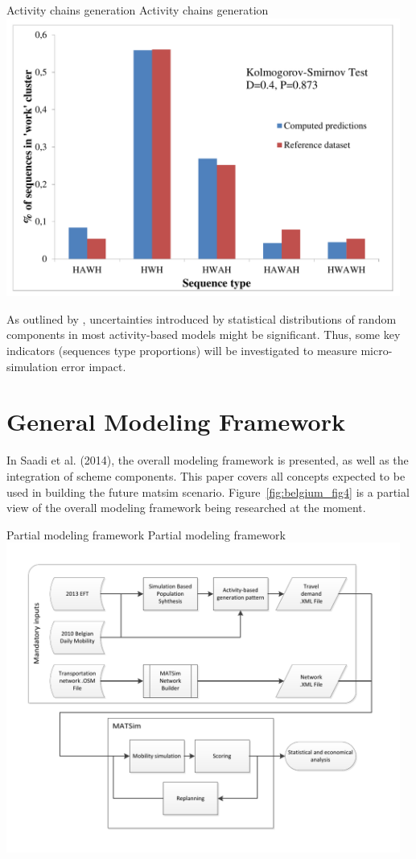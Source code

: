 \createfigure%
{Activity chains generation}%
{Activity chains generation}%
{\label{fig:belgium_fig3}}%
{\includegraphics[width=0.97\textwidth, angle=0]{scenarios/figures/belgium_fig3.pdf}}%
{}

As outlined by \citet[][]{CoolsEtAl_TRB_2011}, uncertainties introduced by statistical distributions of random components in most activity-based models might be significant. 
Thus, some key indicators (\eg sequences type proportions) will be investigated to measure micro-simulation error impact.

\section{General Modeling Framework}
In Saadi et al. (2014), the overall modeling framework is presented, as well as the integration of scheme components. 
This paper covers all concepts expected to be used in building the future \gls{matsim} scenario. 
Figure~\ref{fig:belgium_fig4} is a partial view of the overall modeling framework being researched at the moment.

\createfigure%
{Partial modeling framework}%
{Partial modeling framework}%
{\label{fig:belgium_fig4}}%
{\includegraphics[width=0.97\textwidth, angle=0]{scenarios/figures/belgium_fig4.pdf}}%
{}

